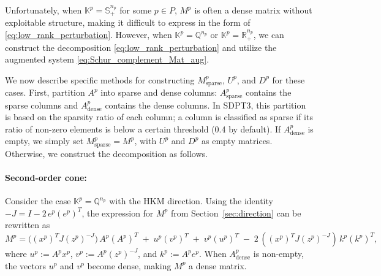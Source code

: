 Unfortunately, when $\mathbb{K}^p = \mathbb{S}^{n_p}_+$ for some $p \in P$, 
$M^p$ is often a dense matrix without exploitable structure, 
making it difficult to express in the form of \eqref{eq:low_rank_perturbation}.
However, when $\mathbb{K}^p = \mathbb{Q}^{n_p}$ or $\mathbb{K}^p = \mathbb{R}^{n_p}_+$, 
we can construct the decomposition \eqref{eq:low_rank_perturbation} 
and utilize the augmented system \eqref{eq:Schur_complement_Mat_aug}.

We now describe specific methods for constructing $M^p_{\mathrm{sparse}}$, $U^p$, and $D^p$ 
for these cases.
First, partition $A^p$ into sparse and dense columns:
$A^p_{\mathrm{sparse}}$ contains the sparse columns and 
$A^p_{\mathrm{dense}}$ contains the dense columns.
In SDPT3, this partition is based on the sparsity ratio of each column;
a column is classified as sparse if its ratio of non-zero elements 
is below a certain threshold (0.4 by default).
If $A^p_{\mathrm{dense}}$ is empty, we simply set $M^p_{\mathrm{sparse}} = M^p$, 
with $U^p$ and $D^p$ as empty matrices.
Otherwise, we construct the decomposition as follows.


\paragraph{Second-order cone:}
Consider the case $\mathbb{K}^p=\mathbb{Q}^{n_p}$ with the HKM direction.
Using the identity $-J = I - 2\,e^p(e^p)^T$, 
the expression for $M^p$ from Section~\ref{sec:direction} can be rewritten as
\[
  M^p 
  = \bigl((x^p)^T J (z^p)^{-J}\bigr)\, A^p(A^p)^T
    \;+\; u^p (v^p)^T
    \;+\; v^p (u^p)^T
    \;-\; 2\,((x^p)^T J (z^p)^{-J})\, k^p (k^p)^T,
\]
where $u^p := A^p x^p$, $v^p := A^p (z^p)^{-J}$, and $k^p := A^p e^p$.
When $A^p_{\mathrm{dense}}$ is non-empty, the vectors $u^p$ and $v^p$ become dense, 
making $M^p$ a dense matrix.

